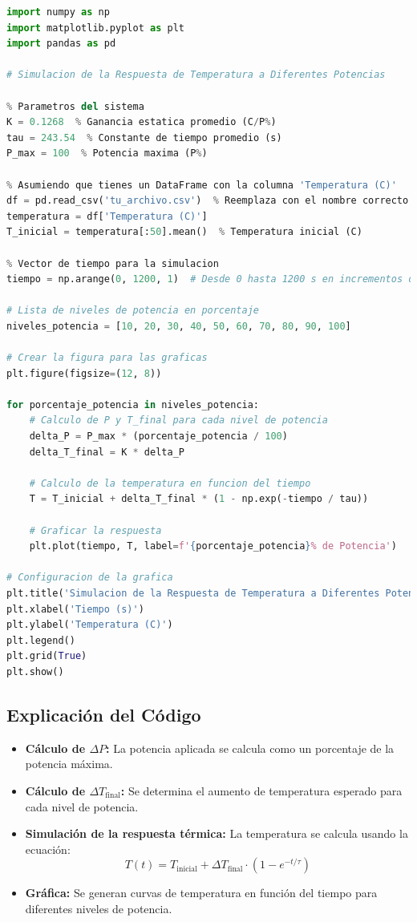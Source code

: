 \documentclass[spanish, a4paper, 11pt]{article}
\begin{document}
\begin{lstlisting}[language=Python]
import numpy as np
import matplotlib.pyplot as plt
import pandas as pd

# Simulacion de la Respuesta de Temperatura a Diferentes Potencias

% Parametros del sistema
K = 0.1268  % Ganancia estatica promedio (C/P%)
tau = 243.54  % Constante de tiempo promedio (s)
P_max = 100  % Potencia maxima (P%)

% Asumiendo que tienes un DataFrame con la columna 'Temperatura (C)'
df = pd.read_csv('tu_archivo.csv')  % Reemplaza con el nombre correcto del archivo
temperatura = df['Temperatura (C)']
T_inicial = temperatura[:50].mean()  % Temperatura inicial (C)

% Vector de tiempo para la simulacion
tiempo = np.arange(0, 1200, 1)  # Desde 0 hasta 1200 s en incrementos de 1 s

# Lista de niveles de potencia en porcentaje
niveles_potencia = [10, 20, 30, 40, 50, 60, 70, 80, 90, 100]

# Crear la figura para las graficas
plt.figure(figsize=(12, 8))

for porcentaje_potencia in niveles_potencia:
    # Calculo de P y T_final para cada nivel de potencia
    delta_P = P_max * (porcentaje_potencia / 100)
    delta_T_final = K * delta_P
    
    # Calculo de la temperatura en funcion del tiempo
    T = T_inicial + delta_T_final * (1 - np.exp(-tiempo / tau))
    
    # Graficar la respuesta
    plt.plot(tiempo, T, label=f'{porcentaje_potencia}% de Potencia')

# Configuracion de la grafica
plt.title('Simulacion de la Respuesta de Temperatura a Diferentes Potencias')
plt.xlabel('Tiempo (s)')
plt.ylabel('Temperatura (C)')
plt.legend()
plt.grid(True)
plt.show()
\end{lstlisting}

\subsection{Explicación del Código}

\begin{itemize}
    \item \textbf{Cálculo de $\Delta P$:} La potencia aplicada se calcula como un porcentaje de la potencia máxima.
    \item \textbf{Cálculo de $\Delta T_{\text{final}}$:} Se determina el aumento de temperatura esperado para cada nivel de potencia.
    \item \textbf{Simulación de la respuesta térmica:} La temperatura se calcula usando la ecuación:
    \[
    T(t) = T_{\text{inicial}} + \Delta T_{\text{final}} \cdot (1 - e^{-t/\tau})
    \]
    \item \textbf{Gráfica:} Se generan curvas de temperatura en función del tiempo para diferentes niveles de potencia.
\end{itemize}
\end{document}
